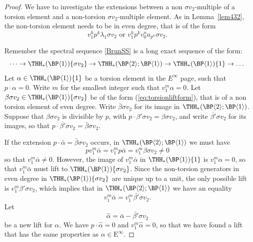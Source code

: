 \begin{proof}
  We have to investigate the extensions between a non $\sigma v_2$-multiple of  a torsion element and a non-torsion $\sigma v_2$-multiple element. As in Lemma~\ref{lem432}, the non-torsion element needs to be in even degree, that is of the form
  \begin{equation} \label{eq:torsionliftform}
    v_1^h p^k \lambda_1 \sigma v_2 \text{ or } v_1^h p^k v_0^n a_{p^n} \sigma v_2.
  \end{equation}

  Remember the spectral sequence \eqref{BrunSS} is a long exact sequence of the form:
  \[
    \dots \rightarrow \THH_*(\BP \langle 1 \rangle)\{ \sigma v_2\} \rightarrow \THH_*(\BP \langle 2 \rangle ; \BP \langle 1 \rangle) \rightarrow \THH_*(\BP \langle 1 \rangle)\{1\} \rightarrow \dots
  \]
  Let $\alpha \in \THH_*(\BP \langle 1 \rangle)\{1\}$ be a torsion element in the $E^\infty$ page, such that $p \cdot \alpha = 0$. Write $m$ for the smallest integer such that $v_1^m \alpha = 0$. Let $\beta \sigma v_2 \in \THH_*(\BP \langle 1 \rangle)\{ \sigma v_2\}$ be of the form (\ref{eq:torsionliftform}), that is of a non torsion element of even degree. Write $\bar{\beta} \sigma v_2$ for its image in $\THH_*(\BP \langle 2 \rangle ; \BP \langle 1 \rangle)$. Suppose that $\beta \sigma v_2$ is divisible by $p$, with $p \cdot \beta' \sigma v_2 = \beta \sigma v_2$, and write $\bar{\beta'} \sigma v_2$ for its images, so that $p \cdot \bar{\beta'} \sigma v_2 = \bar{\beta} \sigma v_2$.

  If the extension $p \cdot \bar{\alpha} = \bar{\beta} \sigma v_2$ occurs, in $\THH_*(\BP \langle 2 \rangle ; \BP \langle 1 \rangle)$ we must have
  \[
    p v_1^m \bar{\alpha} = v_1^m p \bar{\alpha} = v_1^m \beta \sigma v_2 \neq 0
  \]
  so that $v_1^m \bar{\alpha} \neq 0$. However, the image of $v_1^m \bar{\alpha}$ in $\THH_*(\BP \langle 1 \rangle)\{1\}$ is $v_1^m \alpha = 0$, so that $v_1^m \bar{\alpha}$ must lift to $\THH_*(\BP \langle 1 \rangle)\{ \sigma v_2\}$. Since the non-torsion generators in even degree in $\THH_*(\BP \langle 1 \rangle)\{ \sigma v_2\}$ are unique up to a unit, the only possible lift is $v_1^m \beta' \sigma v_2$, which implies that in $\THH_*(\BP \langle 2 \rangle ; \BP \langle 1 \rangle)$ we have an equality
  \[
    v_1^m \bar{\alpha} = v_1^m \bar{\beta'} \sigma v_2.
  \]
  Let
  \[
    \hat{\alpha} = \bar{\alpha} - \bar{\beta'} \sigma v_2
  \]
  be a new lift for $\alpha$. We have $p \cdot \hat{\alpha} = 0$ and $v_1^m \hat{\alpha} = 0$, so that we have found a lift that has the same properties as $\alpha \in \mathrm{E}^\infty$.


\end{proof}
